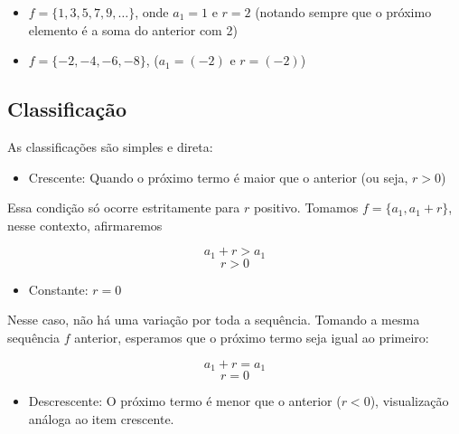 \begin{tcolorbox}[colback=LightGreen]
\begin{itemize}
        \item $f = \{1, 3, 5, 7, 9, \dots\}$, onde $a_{1} = 1$ e $r = 2$ (notando sempre que o próximo elemento é a soma do anterior com 2)

        \item $f = \{-2, -4, -6, -8\}$, ($a_{1} = (-2)$ e $r = (-2)$)
\end{itemize}
\end{tcolorbox}

\subsection{Classificação}

As classificações são simples e direta:

\begin{tcolorbox}[colback=LightGreen]
\begin{itemize}
        \item Crescente: Quando o próximo termo é maior que o anterior (ou seja, $r > 0$)
\end{itemize}

Essa condição só ocorre estritamente para $r$ positivo. Tomamos $f = \{a_{1}, a_{1} + r\}$, nesse contexto, afirmaremos

\[a_{1} + r > a_{1}\]
\[r > 0\]
\end{tcolorbox}


\begin{tcolorbox}[colback=LightGreen]
\begin{itemize}
  \item Constante: $r = 0$
\end{itemize}

Nesse caso, não há uma variação por toda a sequência. Tomando a mesma sequência $f$ anterior, esperamos que o próximo termo seja igual ao primeiro:

\[a_{1} + r = a_{1}\]
\[r = 0\]
\end{tcolorbox}

\begin{tcolorbox}[colback=LightGreen]
\begin{itemize}
  \item Descrescente: O próximo termo é menor que o anterior ($r < 0$), visualização análoga ao item crescente.
\end{itemize}
\end{tcolorbox}

